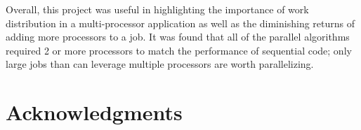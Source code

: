 \documentclass[11pt]{article}
\begin{document}
	Overall, this project was useful in highlighting the importance of work distribution in a multi-processor application as well as the diminishing returns of adding more processors to a job. It was found that all of the parallel algorithms required 2 or more processors to match the performance of sequential code; only large jobs than can leverage multiple processors are worth parallelizing. 

\section{Acknowledgments}
	
\end{document}
